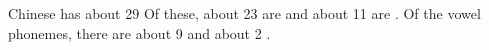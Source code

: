 



Chinese has about {29}  
Of these, about 23 are  and about {11} are .
Of the vowel phonemes, there are about {9} 
and about {2} .

